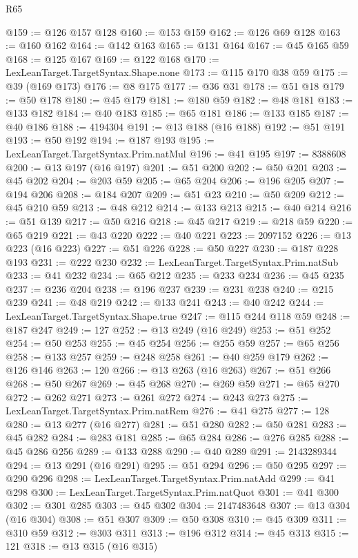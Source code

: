\begin{lexlean}{R65}
\begin{coremodule}
@159 := @126 @157 @128
@160 := @153 @159
@162 := @126 @69 @128
@163 := @160 @162
@164 := @142 @163
@165 := @131 @164
@167 := @45 @165 @59
@168 := @125 @167
@169 := @122 @168
@170 := LexLeanTarget.TargetSyntax.Shape.none
@173 := @115 @170 @38 @59
@175 := @39 (@169 @173)
@176 := @8 @175
@177 := @36 @31
@178 := @51 @18
@179 := @50 @178
@180 := @45 @179
@181 := @180 @59
@182 := @48 @181
@183 := @133 @182
@184 := @40 @183
@185 := @65 @181
@186 := @133 @185
@187 := @40 @186
@188 := 4194304
@191 := @13 @188 (@16 @188)
@192 := @51 @191
@193 := @50 @192
@194 := @187 @193
@195 := LexLeanTarget.TargetSyntax.Prim.natMul
@196 := @41 @195
@197 := 8388608
@200 := @13 @197 (@16 @197)
@201 := @51 @200
@202 := @50 @201
@203 := @45 @202
@204 := @203 @59
@205 := @65 @204
@206 := @196 @205
@207 := @194 @206
@208 := @184 @207
@209 := @51 @23
@210 := @50 @209
@212 := @45 @210 @59
@213 := @48 @212
@214 := @133 @213
@215 := @40 @214
@216 := @51 @139
@217 := @50 @216
@218 := @45 @217
@219 := @218 @59
@220 := @65 @219
@221 := @43 @220
@222 := @40 @221
@223 := 2097152
@226 := @13 @223 (@16 @223)
@227 := @51 @226
@228 := @50 @227
@230 := @187 @228 @193
@231 := @222 @230
@232 := LexLeanTarget.TargetSyntax.Prim.natSub
@233 := @41 @232
@234 := @65 @212
@235 := @233 @234
@236 := @45 @235
@237 := @236 @204
@238 := @196 @237
@239 := @231 @238
@240 := @215 @239
@241 := @48 @219
@242 := @133 @241
@243 := @40 @242
@244 := LexLeanTarget.TargetSyntax.Shape.true
@247 := @115 @244 @118 @59
@248 := @187 @247
@249 := 127
@252 := @13 @249 (@16 @249)
@253 := @51 @252
@254 := @50 @253
@255 := @45 @254
@256 := @255 @59
@257 := @65 @256
@258 := @133 @257
@259 := @248 @258
@261 := @40 @259 @179
@262 := @126 @146
@263 := 120
@266 := @13 @263 (@16 @263)
@267 := @51 @266
@268 := @50 @267
@269 := @45 @268
@270 := @269 @59
@271 := @65 @270
@272 := @262 @271
@273 := @261 @272
@274 := @243 @273
@275 := LexLeanTarget.TargetSyntax.Prim.natRem
@276 := @41 @275
@277 := 128
@280 := @13 @277 (@16 @277)
@281 := @51 @280
@282 := @50 @281
@283 := @45 @282
@284 := @283 @181
@285 := @65 @284
@286 := @276 @285
@288 := @45 @286 @256
@289 := @133 @288
@290 := @40 @289
@291 := 2143289344
@294 := @13 @291 (@16 @291)
@295 := @51 @294
@296 := @50 @295
@297 := @290 @296
@298 := LexLeanTarget.TargetSyntax.Prim.natAdd
@299 := @41 @298
@300 := LexLeanTarget.TargetSyntax.Prim.natQuot
@301 := @41 @300
@302 := @301 @285
@303 := @45 @302
@304 := 2147483648
@307 := @13 @304 (@16 @304)
@308 := @51 @307
@309 := @50 @308
@310 := @45 @309
@311 := @310 @59
@312 := @303 @311
@313 := @196 @312
@314 := @45 @313
@315 := 121
@318 := @13 @315 (@16 @315)

\end{coremodule}
\end{lexlean}
